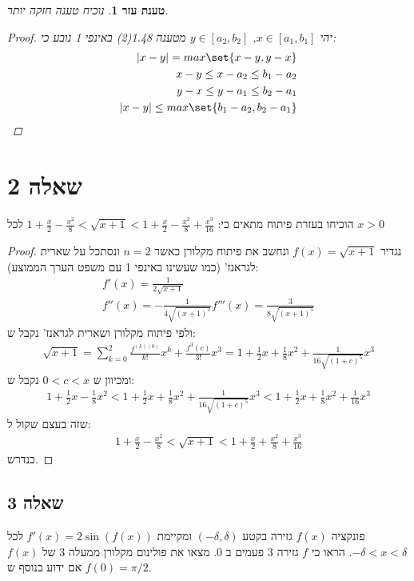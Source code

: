 \documentclass{article}
\DeclarePairedDelimiter\set\{\}
\newtheorem{lemma}[theorem]{טענת עזר}
\begin{document}
	\begin{lemma}\label{lemma:1}
		נוכיח טענה חזקה יותר.
		\begin{proof}
			יהי $x \in [a_1, b_1]$, $y \in [a_2, b_2]$
			מטענה 1.48(2) באינפי 1 נובע כי:
			\begin{align*}
			   \pip{x-y} = max \set{x-y, y-x} \\
			   x - y \leq x - a_2 \leq b_1 - a_2 \\
			   y - x \leq y - a_1 \leq b_2 - a_1 \\
			   \pip{x-y} \leq max \set {b_1 - a_2, b_2 - a_1}
			\end{align*}
		\end{proof}
	\end{lemma}

	\pagebreak
	\section*{שאלה 2}
	הוכיחו בעזרת פיתוח מתאים כי: $1 + \frac{x}{2} - \frac{x^2}{8} < \sqrt{x+1} < 1 + \frac{x}{2} - \frac{x^2}{8} + \frac{x^3}{16}$ לכל $x > 0$
	\begin{proof}
		נגדיר $f(x) = \sqrt{x + 1}$
		ונחשב את פיתוח מקלורן כאשר $n=2$ ונסתכל על שארית לגראנז' (כמו שעשינו באינפי 1 עם משפט הערך הממוצע):
		\begin{align*}
			f'(x) = \frac{1}{2\sqrt{x+1}} \\
			f''(x) = -\frac{1}{4\sqrt{(x+1)^3}}
			f'''(x) = \frac{3}{8\sqrt{(x+1)^5}}
		\end{align*}
		ולפי פיתוח מקלורן ושארית לגראנז' נקבל ש:
		\begin{align*}
			\sqrt{x+1} = \sum^2_{k=0} \frac{f^{(k)(0)}}{k!}x^k + \frac{f^{3}(c)}{3!}x^3
			= 1 + \frac{1}{2}x + \frac{1}{8}x^2 + \frac{1}{16\sqrt{(1+c)^5}}x^3
		\end{align*}
		ומכיוון ש $0 < c < x$ נקבל ש:
		\begin{align*}
			1 + \frac{1}{2}x - \frac{1}{8}x^2 < 1 + \frac{1}{2}x + \frac{1}{8}x^2 + \frac{1}{16\sqrt{(1+c)^5}}x^3 < 1 + \frac{1}{2}x + \frac{1}{8}x^2 + \frac{1}{16}x^3
		\end{align*}
		שזה בעצם שקול ל:
		\begin{align*}
			1 + \frac{x}{2} - \frac{x^2}{8} < \sqrt{x + 1} < 1 + \frac{x}{2} + \frac{x^2}{8} + \frac{x^3}{16}
		\end{align*}
		כנדרש.
	\end{proof}

	\subsection*{שאלה 3}
	פונקציה $f(x)$ גזירה בקטע $(-\delta, \delta)$ ומקיימת $f'(x) = 2 \sin (f(x))$ לכל $- \delta < x < \delta$.
	הראו כי $f$ גזירה 3 פעמים ב 0.
	מצאו את פולינום מקלורן ממעלה 3 של $f(x)$ אם ידוע בנוסף ש $f(0) = \pi/2$.
\end{document}
